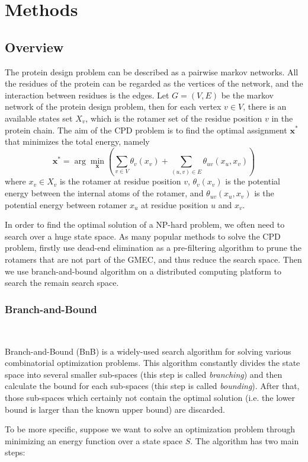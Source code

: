 \section{Methods}
\subsection{Overview}
The protein design problem can be described as a pairwise markov networks. All the residues of the protein can be regarded as the vertices of the network, and the interaction between residues is the edges. Let $G=(V,E)$ be the markov network of the protein design problem, then for each vertex $v\in V$, there is an available states set $X_v$, which is the rotamer set of the residue position $v$ in the protein chain. The aim of the CPD problem is to find the optimal assignment $\mathbf{x^*}$ that minimizes the total energy, namely
\[ \mathbf{x^*} = \arg\min_{\mathbf{x}}\left(\sum_{v\in V}\theta_v(x_v) + \sum_{(u,v)\in E}\theta_{uv}(x_u,x_v)\right) \]
where $x_v\in X_v$ is the rotamer at residue position $v$, $\theta_v(x_v)$ is the potential energy between the internal atoms of the rotamer, and $\theta_{uv}(x_u,x_v)$ is the potential energy between rotamer $x_u$ at residue position $u$ and $x_v$.

In order to find the optimal solution of a NP-hard problem, we often need to search over a huge state space. As many popular methods to solve the CPD problem, firstly use dead-end elimination as a pre-filtering algorithm to prune the rotamers that are not part of the GMEC, and thus reduce the search space. Then we use branch-and-bound algorithm on a distributed computing platform to search the remain search space.

\subsubsection{Branch-and-Bound}\

\noindent Branch-and-Bound (BnB) is a widely-used search algorithm for solving various combinatorial optimization problems. This algorithm constantly divides the state space into several smaller sub-spaces (this step is called \textit{branching}) and then calculate the bound for each sub-spaces (this step is called \textit{bounding}). After that, those sub-spaces which certainly not contain the optimal solution (i.e. the lower bound is larger than the known upper bound) are discarded.

To be more specific, suppose we want to solve an optimization problem through minimizing an energy function over a state space $S$. The algorithm has two main steps:

